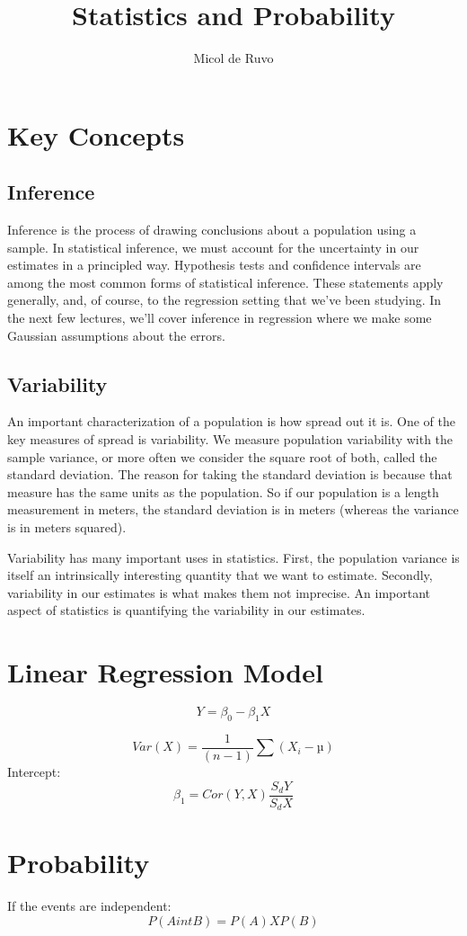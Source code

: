 \documentclass[12pt,a4paper]{article}
\title{Statistics and Probability}
\author{Micol de Ruvo}
\begin{document}
\maketitle
\section*{Key Concepts}

\subsection*{Inference}

Inference is the process of drawing conclusions about a population using a sample. In statistical inference, we must account for the uncertainty in our estimates in a principled way. Hypothesis tests and confidence intervals are among the most common forms of statistical inference. 
These statements apply generally, and, of course, to the regression setting that we've been studying. In the next few lectures, we'll cover inference in regression where we make some Gaussian assumptions about the errors.

\subsection*{Variability}

An important characterization of a population is how spread out it is. One of the key measures of spread is variability. We measure population variability with the sample variance, or more often we consider the square root of both, called the standard deviation. The reason for taking the standard deviation is because that measure has the same units as the population. So if our population is a length measurement in meters, the standard deviation is in meters (whereas the variance is in meters squared).

Variability has many important uses in statistics. First, the population variance is itself an intrinsically interesting quantity that we want to estimate. Secondly, variability in our estimates is what makes them not imprecise. An important aspect of statistics is quantifying the variability in our estimates.


\section*{Linear Regression Model}

\[Y=\beta_{0}-\beta_{1}X\]

\[Var(X)=\frac{1}{(n-1)}\sum(X_{i}-µ)\]
Intercept: \[\beta_{1}=Cor(Y,X)\frac{S_{d}Y}{S_{d}X}\]


\section*{Probability}

If the events are independent: 
\[P(AintB)=P(A)XP(B)\]
\end{document}
